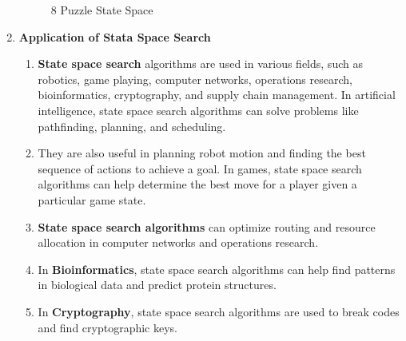 \documentclass[11pt]{article}
\begin{document}
\begin{enumerate}
\begin{figure}[H]
              \caption{8 Puzzle State Space}
          \end{figure}
    \item \textbf{Application of Stata Space Search}\\
          \begin{enumerate}
              \item \textbf{State space search} algorithms are used in various fields, such as robotics, game playing,
                    computer networks, operations research, bioinformatics, cryptography, and supply chain
                    management. In artificial intelligence, state space search algorithms can solve problems
                    like pathfinding, planning, and scheduling.
              \item They are also useful in planning robot motion and finding the best sequence of actions to
                    achieve a goal. In games, state space search algorithms can help determine the best move
                    for a player given a particular game state.
              \item \textbf{State space search algorithms} can optimize routing and resource allocation in computer
                    networks and operations research.
              \item In \textbf{Bioinformatics}, state space search algorithms can help find patterns in biological data
                    and predict protein structures.
              \item In \textbf{Cryptography}, state space search algorithms are used to break codes and find
                    cryptographic keys.
          \end{enumerate}

\end{enumerate}
\end{document}
